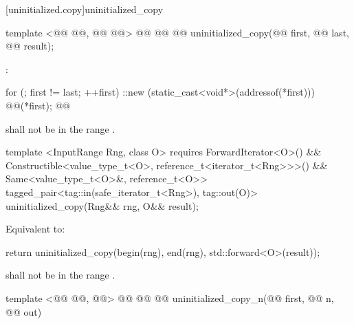 [uninitialized.copy]{uninitialized_copy}
\begin{codeblock}
  template <@@ @@, @@
            @@>
    @@
             @@
  @@
    uninitialized_copy(@@ first, @@ last, @@ result);
\end{codeblock}

\setcounter{Paras}{0}
\pnum
\effects {}:
\begin{codeblock}
        for (; first != last; ++first)
          ::new (static_cast<void*>(addressof(*first)))
            @@(*first);
        @@
\end{codeblock}

{\color{newclr}
\pnum
\requires {} shall not be in the range \tcode{[first, last)}.

\begin{codeblock}
  template <InputRange Rng, class O>
    requires ForwardIterator<O>() &&
             Constructible<value_type_t<O>, reference_t<iterator_t<Rng>>>() &&
             Same<value_type_t<O>&, reference_t<O>>
  tagged_pair<tag::in(safe_iterator_t<Rng>), tag::out(O)>
    uninitialized_copy(Rng&& rng, O&& result);
\end{codeblock}

\pnum
\effects Equivalent to:
\begin{codeblock}
        return uninitialized_copy(begin(rng), end(rng), std::forward<O>(result));
\end{codeblock}
\pnum
\requires {} shall not be in the range \tcode{[first, last)}.
} %

\begin{codeblock}
  template <@@ @@, @@>
    @@
             @@
  @@
    uninitialized_copy_n(@@ first, @@ n,
                         @@ out)
\end{codeblock}

